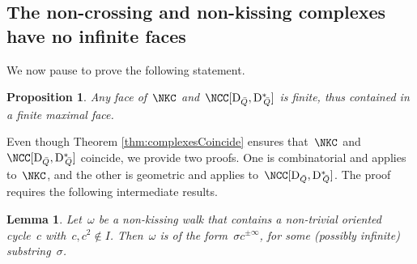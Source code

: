 \documentclass{amsart}
\newtheorem{proposition}[theorem]{Proposition}
\newtheorem{lemma}[theorem]{Lemma}
\theoremstyle{definition}
\newcommand{\dual}{^*} %
\newcommand{\dissection}{\mathrm{D}} %
\begin{document}
\subsection{The non-crossing and non-kissing complexes have no infinite faces}

We now pause to prove the following statement.

\begin{proposition}
\label{prop:facetsAreFinite}
Any face of~$\NKC$ and~$\NCC[\dissection_{\bar Q}, {\dissection\dual\!\!_{\bar Q}}]$ is finite, thus contained in a finite maximal face.
\end{proposition}

Even though Theorem \ref{thm:complexesCoincide} ensures that~$\NKC$ and~$\NCC[\dissection_{\bar Q}, {\dissection\dual\!\!_{\bar Q}}]$ coincide, we provide two proofs.
One is combinatorial and applies to~$\NKC$, and the other is geometric and applies to~$\NCC[\dissection_{\bar Q}, {\dissection\dual\!\!_{\bar Q}}]$.
The proof requires the following intermediate results.

\begin{lemma}
\label{lem:nkCycles}
Let~$\omega$ be a non-kissing walk that contains a non-trivial oriented cycle~$c$ with~$c, c^2\notin I$.
Then~$\omega$ is of the form~$\sigma c^{\pm\infty}$, for some (possibly infinite) substring~$\sigma$.
\end{lemma}
\end{document}
